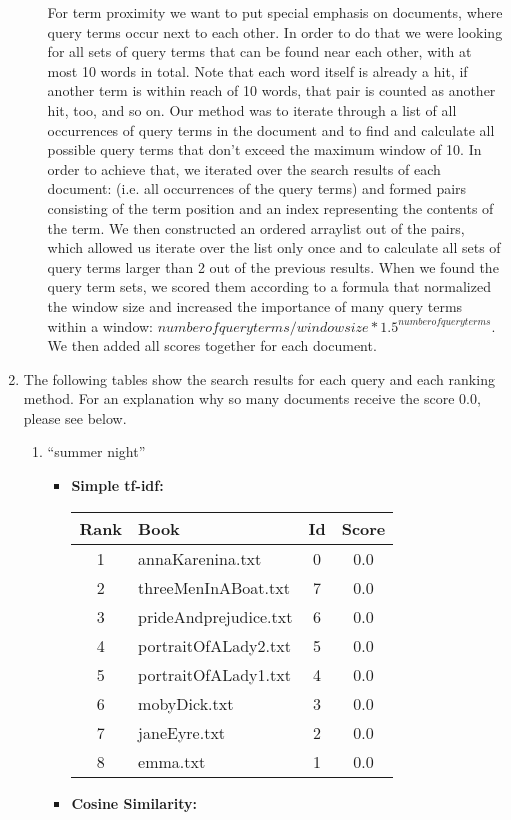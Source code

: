 \documentclass[a4paper,11pt,oneside]{book}
\begin{document}
\begin{enumerate}
\begin{itemize}
								For term proximity we want to put special emphasis on documents, where query terms occur next to each other. In order to do that we were looking for all sets of query terms that can be found near each other, with at most 10 words in total. Note that each word itself is already a hit, if another term is within reach of 10 words, that pair is counted as another hit, too, and so on. Our method was to iterate through a list of all occurrences of query terms in the document and to find and calculate all possible query terms that don't exceed the maximum window of 10. In order to achieve that, we iterated over the search results of each document: (i.e. all occurrences of the query terms) and formed pairs consisting of the term position and an index representing the contents of the term. We then constructed an ordered arraylist out of the pairs, which allowed us iterate over the list only once and to calculate all sets of query terms larger than 2 out of the previous results. When we found the query term sets, we scored them according to a formula that normalized the window size and increased the importance of many query terms within a window: $number of query terms/ window size * 1.5^{number of query terms}$. We then added all scores together for each document.
									
					\end{itemize}
		
		
		\item The following tables show the search results for each query and each ranking method. For an explanation why so many documents receive the score 0.0, please see below.

		
		\begin{enumerate}
			\item ``summer night''
						\begin{itemize}
							\item \textbf{Simple tf-idf:}
							
										\begin{tabular}{clcc}
											\toprule
												\textbf{Rank} & \textbf{Book} & \textbf{Id} & \textbf{Score}\\
											\hline
												1	&	annaKarenina.txt	&	0	&	0.0	\\
												2	&	threeMenInABoat.txt	&	7	&	0.0	\\
												3	&	prideAndprejudice.txt	&	6	&	0.0	\\
												4	&	portraitOfALady2.txt	&	5	&	0.0	\\
												5	&	portraitOfALady1.txt	&	4	&	0.0	\\
												6	&	mobyDick.txt	&	3	&	0.0	\\
												7	&	janeEyre.txt	&	2	&	0.0	\\
												8	&	emma.txt	&	1	&	0.0	\\
											\bottomrule
										\end{tabular}\newline
							\item \textbf{Cosine Similarity:}
							

\end{itemize}
\end{enumerate}
\end{enumerate}
\end{document}
